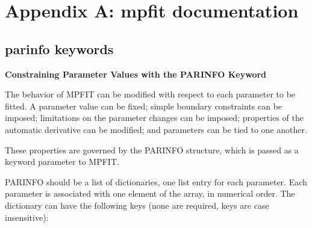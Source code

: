 
\chapter{Appendix A: mpfit documentation}

\section{parinfo keywords}
\label{sec:parinfo}

\textbf{Constraining Parameter Values with the PARINFO Keyword}

The behavior of MPFIT can be modified with respect to each
parameter to be fitted.  A parameter value can be fixed; simple
boundary constraints can be imposed; limitations on the parameter
changes can be imposed; properties of the automatic derivative can
be modified; and parameters can be tied to one another.

These properties are governed by the PARINFO structure, which is
passed as a keyword parameter to MPFIT.

PARINFO should be a list of dictionaries, one list entry for each parameter.
Each parameter is associated with one element of the array, in
numerical order.  The dictionary can have the following keys
(none are required, keys are case insensitive):

